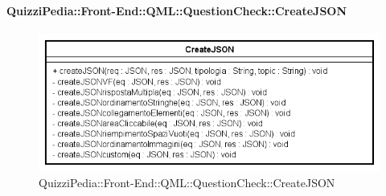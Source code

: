 \paragraph[QuizziPedia::Front-End::QML:: \\ QuestionCheck::CreateJSON]{QuizziPedia::Front-End::QML::QuestionCheck::CreateJSON}
\begin{figure} [ht]
	\centering
	\includegraphics[scale=0.80]{UML/Classi/Front-End/QuizziPedia_Front-end_QML_QuestionCheck_CreateJSON.png}
	\caption{QuizziPedia::Front-End::QML::QuestionCheck::CreateJSON}
\end{figure} \FloatBarrier
